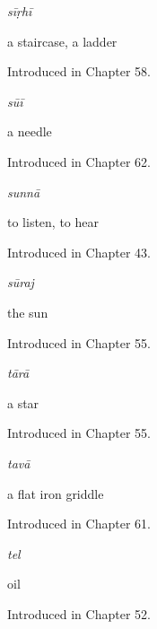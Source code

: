 \noindent\begin{minipage}[t]{\linewidth}
\raggedright
\textbf{}\enspace\emph{sīṛhī}\par
\small a staircase, a ladder\par
\footnotesize Introduced in Chapter 58.
\end{minipage}\par\medskip

\noindent\begin{minipage}[t]{\linewidth}
\raggedright
\textbf{}\enspace\emph{sūī}\par
\small a needle\par
\footnotesize Introduced in Chapter 62.
\end{minipage}\par\medskip

\noindent\begin{minipage}[t]{\linewidth}
\raggedright
\textbf{}\enspace\emph{sunnā}\par
\small to listen, to hear\par
\footnotesize Introduced in Chapter 43.
\end{minipage}\par\medskip

\noindent\begin{minipage}[t]{\linewidth}
\raggedright
\textbf{}\enspace\emph{sūraj}\par
\small the sun\par
\footnotesize Introduced in Chapter 55.
\end{minipage}\par\medskip

\noindent\begin{minipage}[t]{\linewidth}
\raggedright
\textbf{}\enspace\emph{tārā}\par
\small a star\par
\footnotesize Introduced in Chapter 55.
\end{minipage}\par\medskip

\noindent\begin{minipage}[t]{\linewidth}
\raggedright
\textbf{}\enspace\emph{tavā}\par
\small a flat iron griddle\par
\footnotesize Introduced in Chapter 61.
\end{minipage}\par\medskip

\noindent\begin{minipage}[t]{\linewidth}
\raggedright
\textbf{}\enspace\emph{tel}\par
\small oil\par
\footnotesize Introduced in Chapter 52.
\end{minipage}\par\medskip

